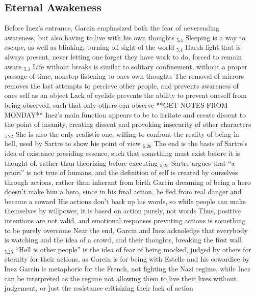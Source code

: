 \documentclass[11 pt, twoside]{article}
\newenvironment{outline*}
{
	\begin{outline}[enumerate]
	}
	{\end{outline}
}
\newcommand{\footb}[2]{\hyperlink{#1}{$_{#1.#2}$}}
\begin{document}
\subsection{Eternal Awakeness}
\begin{outline*}
\1 Before Inez's entrance, Garcin emphasized both the fear of neverending awareness, but also having to live with his own thoughts \footb{5}{4}
\2 Sleeping is a way to escape, as well as blinking, turning off sight of the world \footb{5}{4}
\2 Harsh light that is always present, never letting one forget they have work to do, forced to remain aware \footb{5}{3}
\1 Life without breaks is similar to solitary confinement, without a proper passage of time, nonstop listening to ones own thoughts
\2 The removal of mirrors removes the last attempts to percieve other people, and prevents awareness of ones self as an object
\2 Lack of eyelids prevents the ability to prevent oneself from being observed, such that only others can observe
\1 **GET NOTES FROM MONDAY** 
\1 Inez's main function appears to be to irritate and create dissent to the point of insanity, creating dissent and provoking insecurity of other characters \footb{5}{22}
\2 She is also the only realistic one, willing to confront the reality of being in hell, used by Sartre to show his point of view  \footb{5}{26}
\1 The end is the basis of Sartre's idea of existance presiding essence, such that something must exist before it is thought of, rather than theorizing before executing \footb{5}{25}
\2 Sartre argues that ``a priori'' is not true of humans, and the definition of self is created by ourselves through actions, rather than inherant from birth
\2 Garcin dreaming of being a hero doesn't make him a hero, since in his final action, he fled from real danger and became a coward
\2 His actions don't back up his words, so while people can make themselves by willpower, it is based on action purely, not words
\2 Thus, positive intentions are not valid, and emotional responses prevnting actions is something to be purely overcome
\1 Near the end, Garcin and Inez acknoledge that everybody is watching and the idea of a crowd, and their thoughts, breaking the first wall \footb{5}{26}
\2 ``Hell is other people'' is the idea of fear of being mocked, judged by others for eternity for their actions, as Garcin is for being with Estelle and his cowardice by Inez
\2 Garcin is metaphoric for the French, not fighting the Nazi regime, while Inez can be interpreted as the regime not allowing them to live their lives without judgement, or just the resistance critisizing their lack of action
\end{outline*}
\end{document}
